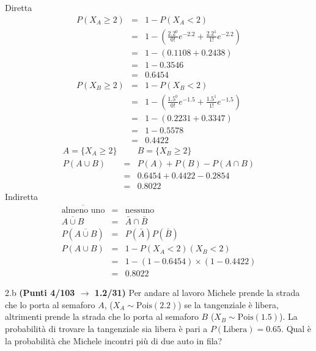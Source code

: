 \documentclass[
  11pt,
]{book}
\theoremstyle{mytheoremstyle}
\theoremstyle{mydefstyle}
\newenvironment{sol}
  {
  \begin{tcolorbox}[enhanced,breakable,arc=0.1mm,boxrule=1pt,colback=white,colframe=iblue,
  title=\bf \fontfamily{lmss}\selectfont \hspace{.5 cm} Soluzione,drop fuzzy shadow]

}{
\end{tcolorbox}
  }
\begin{document}
\begin{sol}
Diretta
\begin{eqnarray*}
   P( X_A \geq 2 ) &=& 1-P( X_A < 2 ) \\                 &=& 1-\left( \frac{ 2.2 ^{ 0 }}{ 0 !}e^{- 2.2 }+\frac{ 2.2 ^{ 1 }}{ 1 !}e^{- 2.2 } \right)\\                 &=& 1-( 0.1108+0.2438 )\\                 &=& 1- 0.3546 \\                 &=&   0.6454 
\end{eqnarray*}
\begin{eqnarray*}
   P( X_B \geq 2 ) &=& 1-P( X_B < 2 ) \\                 &=& 1-\left( \frac{ 1.5 ^{ 0 }}{ 0 !}e^{- 1.5 }+\frac{ 1.5 ^{ 1 }}{ 1 !}e^{- 1.5 } \right)\\                 &=& 1-( 0.2231+0.3347 )\\                 &=& 1- 0.5578 \\                 &=&   0.4422 
\end{eqnarray*}
\begin{eqnarray*}
  A =\{X_A\ge 2\} && B =\{X_B\ge 2\}\\
  P(A\cup B) &=&  P(A)+P(B)-P(A\cap B)\\
  &=& 0.6454+0.4422-0.2854\\
  &=& 0.8022
\end{eqnarray*}
Indiretta
\begin{eqnarray*}
  \overline{\text{almeno uno}} &=&  \text{nessuno}\\
  \overline{A\cup B} &=& \bar A\cap \bar B\\
  P(\overline{A\cup B}) &=& P(\bar A)P(\bar B)\\
  P(A\cup B) &=& 1- P(X_A<2)(X_B<2)\\
  &=& 1-(1-0.6454 )\times(1-0.4422)\\
  &=& 0.8022
\end{eqnarray*}

\end{sol}

2.b \textbf{(Punti 4/103 \(\rightarrow\) 1.2/31)} Per andare al lavoro Michele prende la strada che
lo porta al semaforo \(A\), (\(X_A\sim \text{Pois}(2.2)\)) se la tangenziale è libera, altrimenti
prende la strada che lo porta al semaforo \(B\) (\(X_B\sim \text{Pois}(1.5)\)).
La probabilità di trovare la tangenziale sia libera è pari a
\(P(\text{Libera})=0.65\). Qual è la probabilità che Michele incontri più di due auto in fila?
\end{document}
